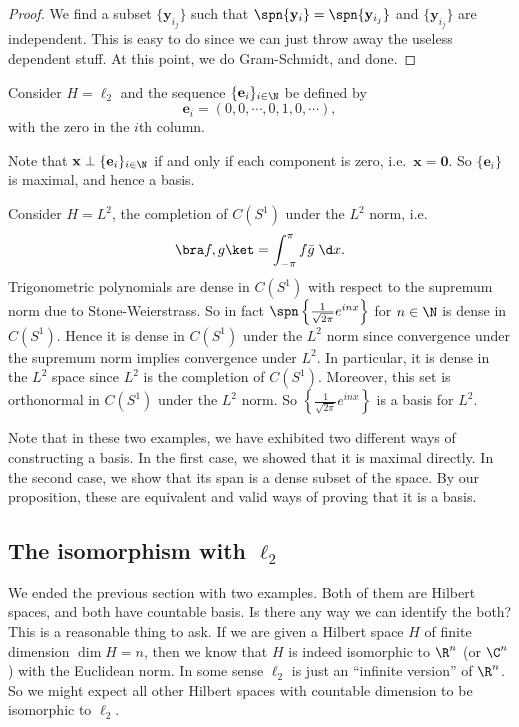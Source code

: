 \documentclass[a4paper]{article}
\begin{document}
\begin{proof}
  We find a subset $\{\mathbf{y}_{i_j}\}$ such that $\spn \{\mathbf{y}_i\} = \spn\{\mathbf{y}_{i_j}\}$ and $\{\mathbf{y}_{i_j}\}$ are independent. This is easy to do since we can just throw away the useless dependent stuff. At this point, we do Gram-Schmidt, and done.
\end{proof}

\begin{eg}
  Consider $H = \ell_2$ and the sequence $\{\mathbf{e}_i\}_{i \in \N}$ be defined by
  \[
    \mathbf{e}_i = (0, 0, \cdots, 0, 1, 0, \cdots),
  \]
  with the zero in the $i$th column.

  Note that $\mathbf{x} \perp \{\mathbf{e}_i\}_{i \in \N}$ if and only if each component is zero, i.e.\ $\mathbf{x} = \mathbf{0}$. So $\{\mathbf{e}_i\}$ is maximal, and hence a basis.
\end{eg}

\begin{eg}
  Consider $H = L^2$, the completion of $C(S^1)$ under the $L^2$ norm, i.e.
  \[
    \bra f, g\ket = \int_{-\pi}^\pi f\bar{g}\;\d x.
  \]
  Trigonometric polynomials are dense in $C(S^1)$ with respect to the supremum norm due to Stone-Weierstrass. So in fact $\spn \left\{\frac{1}{\sqrt{2\pi}}e^{inx}\right\}$ for $n \in \N$ is dense in $C(S^1)$. Hence it is dense in $C(S^1)$ under the $L^2$ norm since convergence under the supremum norm implies convergence under $L^2$. In particular, it is dense in the $L^2$ space since $L^2$ is the completion of $C(S^1)$. Moreover, this set is orthonormal in $C(S^1)$ under the $L^2$ norm. So $\left\{\frac{1}{\sqrt{2\pi}} e^{inx}\right\}$ is a basis for $L^2$.
\end{eg}
Note that in these two examples, we have exhibited two different ways of constructing a basis. In the first case, we showed that it is maximal directly. In the second case, we show that its span is a dense subset of the space. By our proposition, these are equivalent and valid ways of proving that it is a basis.

\subsection{The isomorphism with \texorpdfstring{$\ell_2$}{l2}}
We ended the previous section with two examples. Both of them are Hilbert spaces, and both have countable basis. Is there any way we can identify the both? This is a reasonable thing to ask. If we are given a Hilbert space $H$ of finite dimension $\dim H = n$, then we know that $H$ is indeed isomorphic to $\R^n$ (or $\C^n$) with the Euclidean norm. In some sense $\ell_2$ is just an ``infinite version'' of $\R^n$. So we might expect all other Hilbert spaces with countable dimension to be isomorphic to $\ell_2$.
\end{document}
